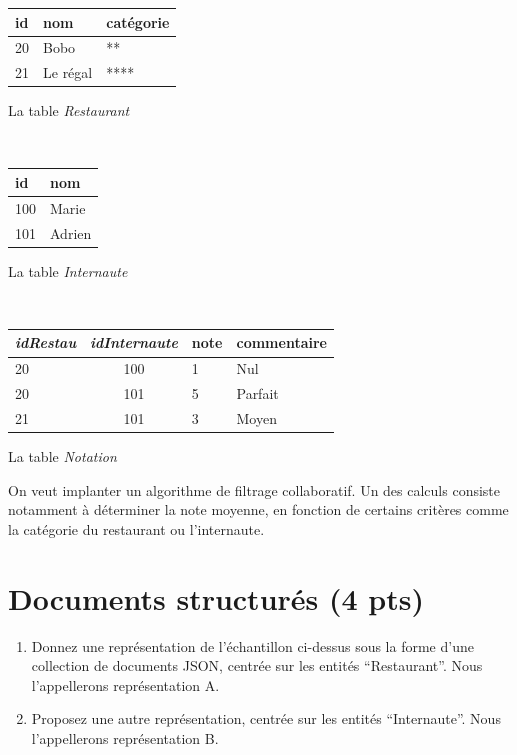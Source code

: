 \documentclass[10pt,a4paper]{article}
\newcommand{\cle}[1]{\textbf{#1}}
\def\fk#1{\textit{#1}}
\def\tble#1{\textit{#1}}
\begin{document}
\vspace*{0.2cm}
\begin{small}
\begin{minipage}[b]{4cm}
\begin{tabular}{l|l|l}
\cle{id} & nom & catégorie\\
\hline
20 & Bobo & ** \\
21 & Le régal & ****\\
\hline
\end{tabular}

\centerline{La table \tble{Restaurant}}
\end{minipage} \hspace*{0.5cm} \
\begin{minipage}[b]{2cm}
\begin{tabular}{l|l}
\cle{id} &  nom  \\
\hline
100 & Marie \\
101 & Adrien \\
\hline
\end{tabular}
\centerline{La table \tble{Internaute}}
\end{minipage} \hspace*{1cm} \
\begin{minipage}[b]{3cm}
\begin{tabular}{l|c|l|l}
\cle{\fk{idRestau}} & \cle{\fk{idInternaute}}  & note & commentaire \\
\hline
20  & 100  & 1 & Nul\\
20 & 101  & 5 & Parfait\\
21 & 101  & 3 & Moyen\\
\hline
\end{tabular}

\centerline{La table \tble{Notation}}
\end{minipage}
\end{small}

On veut implanter  un algorithme de filtrage collaboratif. Un des calculs consiste notamment
à déterminer la note moyenne, en fonction de
certains critères comme la catégorie du restaurant ou l'internaute.
 
\section{Documents structurés (4 pts)}

\begin{enumerate}
  \item Donnez une représentation de l'échantillon ci-dessus sous la forme d'une collection
      de documents JSON, centrée sur les entités ``Restaurant''. 
      Nous l'appellerons représentation A.
  \item Proposez une autre représentation, centrée sur les entités ``Internaute''.  
      Nous l'appellerons représentation B.
\end{enumerate}
\end{document}
